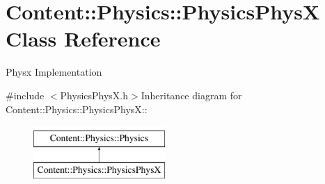 \hypertarget{classContent_1_1Physics_1_1PhysicsPhysX}{
\section{Content::Physics::PhysicsPhysX Class Reference}
\label{classContent_1_1Physics_1_1PhysicsPhysX}
}


Physx Implementation  


{\ttfamily \#include $<$PhysicsPhysX.h$>$}Inheritance diagram for Content::Physics::PhysicsPhysX::\begin{figure}[H]
\begin{center}
\leavevmode
\includegraphics[height=2cm]{classContent_1_1Physics_1_1PhysicsPhysX}
\end{center}
\end{figure}

